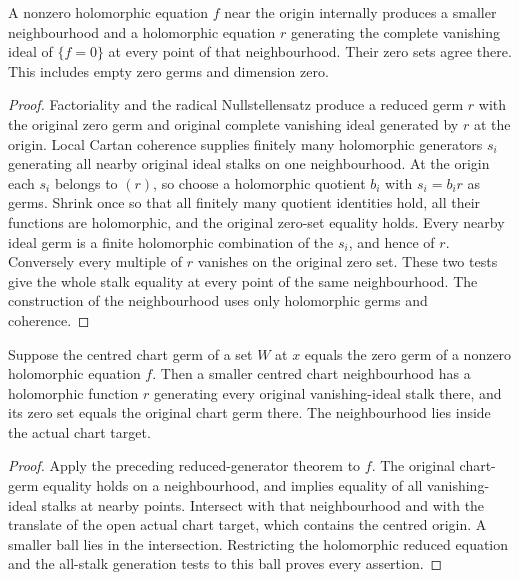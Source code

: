 \begin{lemma}
\label{hir:original-reduced-generator-neighbourhood}
\leanok
A nonzero holomorphic equation $f$ near the origin internally produces a
smaller neighbourhood and a holomorphic equation $r$ generating the
complete vanishing ideal of $\{f=0\}$ at every point of that neighbourhood.
Their zero sets agree there. This includes empty zero germs and dimension
zero.
\end{lemma}
\begin{proof}
Factoriality and the radical Nullstellensatz produce a reduced germ $r$
with the original zero germ and original complete vanishing ideal
generated by $r$ at the origin. Local Cartan coherence supplies finitely
many holomorphic generators $s_i$ generating all nearby original ideal
stalks on one neighbourhood. At the origin each $s_i$ belongs to $(r)$,
so choose a holomorphic quotient $b_i$ with $s_i=b_i r$ as germs.
Shrink once so that all finitely many quotient identities hold, all
their functions are holomorphic, and the original zero-set equality
holds. Every nearby ideal germ is a finite holomorphic combination of
the $s_i$, and hence of $r$. Conversely every multiple of $r$ vanishes on
the original zero set. These two tests give the whole stalk equality at
every point of the same neighbourhood. The construction of the
neighbourhood uses only holomorphic germs and coherence.
\end{proof}

\begin{lemma}
\label{hir:original-principal-chart-neighbourhood}
\leanok
Suppose the centred chart germ of a set $W$ at $x$ equals the zero germ
of a nonzero holomorphic equation $f$. Then a smaller centred chart
neighbourhood has a holomorphic function $r$ generating every original
vanishing-ideal stalk there, and its zero set equals the original chart
germ there. The neighbourhood lies inside the actual chart target.
\end{lemma}
\begin{proof}
Apply the preceding reduced-generator theorem to $f$. The original
chart-germ equality holds on a neighbourhood, and implies equality of
all vanishing-ideal stalks at nearby points. Intersect with that
neighbourhood and with the translate of the open actual chart target,
which contains the centred origin. A smaller ball lies in the
intersection. Restricting the holomorphic reduced equation and the
all-stalk generation tests to this ball proves every assertion.
\end{proof}

